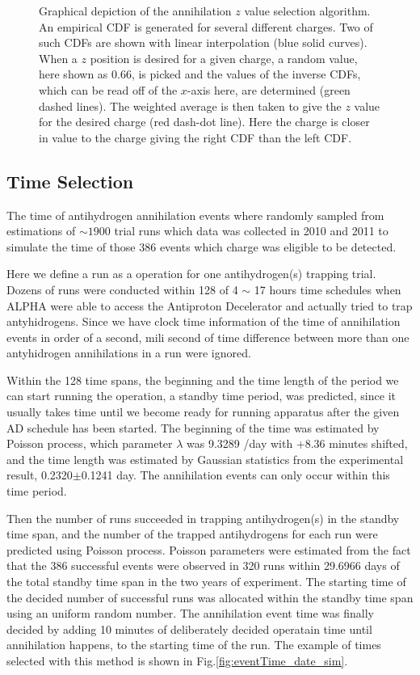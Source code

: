 \documentclass[superscriptaddress,aps,prb,11pt]{revtex4-1}
\begin{document}
\begin{figure}
  \label{fig:z_interpolation}
  \caption{Graphical depiction of the annihilation $z$ value selection algorithm.  An empirical CDF is generated for several different charges.  Two of such CDFs are shown with linear interpolation (blue solid curves).  When a $z$ position is desired for a given charge, a random value, here shown as 0.66, is picked and the values of the inverse CDFs, which can be read off of the $x$-axis here, are determined (green dashed lines).  The weighted average is then taken to give the $z$ value for the desired charge (red dash-dot line).  Here the charge is closer in value to the charge giving the right CDF than the left CDF.}
\end{figure}

\subsection*{Time Selection}
 The time of antihydrogen annihilation events where randomly sampled from estimations of $\sim 1900$  trial runs which data was collected in 2010 and 2011 to simulate the time of those 386 events which charge was eligible to be detected.
 
 Here we define a run as a operation for one antihydrogen(s) trapping trial. Dozens of runs were conducted within 128 of 4 $\sim$ 17 hours time schedules when ALPHA were able to access the Antiproton Decelerator and actually tried to trap antyhidrogens. Since we have clock time information of the time of annihilation events in order of a second, mili second of  time difference between more than one antyhidrogen annihilations  in a run were ignored.
 
 Within the 128 time spans, the beginning and the time length of the period we can start running the operation, a standby time period, was predicted, since it usually takes time until we become ready for running apparatus after the given AD schedule has been started. The beginning of the time was estimated by Poisson process, which parameter $\lambda$ was 9.3289 /day  with +8.36 minutes shifted, and the time length was estimated by Gaussian statistics from the experimental result, 0.2320$\pm$0.1241 day. The annihilation events can only occur within this time period. 
 
 Then the number of runs succeeded in trapping antihydrogen(s) in the standby time span, and the number of the trapped antihydrogens for each run were predicted using Poisson process. Poisson parameters were estimated from the fact that the 386 successful events were observed in 320 runs within 29.6966 days of the total standby time span in the two years of experiment. 
The starting time of the decided number of  successful runs was allocated within the standby time span using an uniform random number. The annihilation event time was finally decided by adding 10 minutes of deliberately decided operatain time until annihilation happens, to the starting time of the run. The example of times selected with this method is shown in Fig.\ref{fig:eventTime_date_sim}.
 
\end{document}
